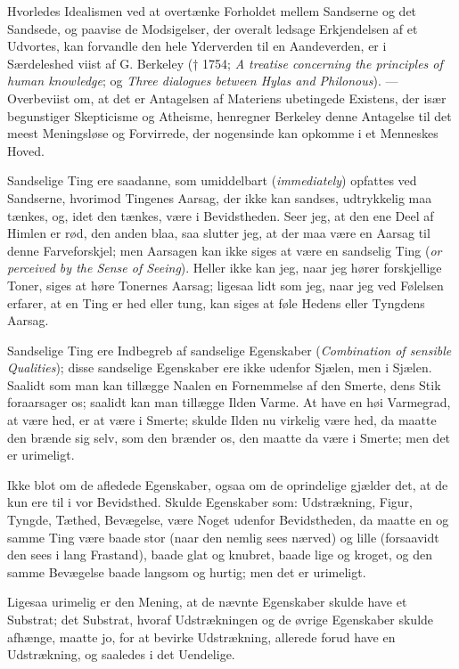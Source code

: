 \documentclass[12pt]{book}
\newcommand{\opage}[1]{\marginnote{\footnotesize\textit{[#1]}}}
\begin{document}
\opage{20} Hvorledes Idealismen ved at overtænke Forholdet mellem Sandserne og det Sandsede,
og paavise de Modsigelser, der overalt ledsage Erkjendelsen af et Udvortes, kan
forvandle den hele Yderverden til en Aandeverden, er i Særdeleshed viist af G.
Berkeley († 1754; \textit{A treatise concerning the principles of human
knowledge}; og \textit{Three dialogues between Hylas and Philonous}). ---
Overbeviist om, at det er Antagelsen af Materiens ubetingede Existens, der især
begunstiger Skepticisme og Atheisme, henregner Berkeley denne Antagelse til det
meest Meningsløse og Forvirrede, der nogensinde kan opkomme i et Menneskes Hoved.

Sandselige Ting ere saadanne, som umiddelbart (\textit{immediately}) opfattes ved
Sandserne, hvorimod Tingenes Aarsag, der ikke kan sandses, udtrykkelig maa tænkes,
og, idet den tænkes, være i Bevidstheden. Seer jeg, at den ene Deel af Himlen er
rød, den anden blaa, saa slutter jeg, at der maa være en Aarsag til denne
Farveforskjel; men Aarsagen kan ikke siges at være en sandselig Ting (\textit{or
perceived by the Sense of Seeing}). Heller ikke kan jeg, naar jeg hører
forskjellige Toner, siges at høre Tonernes Aarsag; ligesaa lidt som jeg, naar jeg
ved Følelsen erfarer, at en Ting er hed eller tung, kan siges at føle Hedens eller
Tyngdens Aarsag.

Sandselige Ting ere Indbegreb af sandselige Egenskaber (\textit{Combination of
sensible Qualities}); disse sandselige Egenskaber ere ikke udenfor Sjælen, men i
Sjælen. Saalidt som man kan tillægge Naalen en Fornemmelse af den Smerte, dens Stik
foraarsager os; saalidt kan man tillægge Ilden Varme. At have en høi Varmegrad, at
være hed, er at være i Smerte; skulde Ilden nu virkelig være hed, da maatte den
brænde sig selv, som den brænder os, den maatte da være i Smerte; men det er
urimeligt.

Ikke blot om de afledede Egenskaber, ogsaa om de oprindelige gjælder det, at de kun
ere til i vor Bevidsthed. Skulde Egenskaber som: Udstrækning, Figur, Tyngde,
Tæthed,
\opage{21} Bevægelse, være Noget udenfor Bevidstheden, da maatte en og samme Ting være baade
stor (naar den nemlig sees nærved) og lille (forsaavidt den sees i lang Frastand),
baade glat og knubret, baade lige og kroget, og den samme Bevægelse baade langsom
og hurtig; men det er urimeligt.

Ligesaa urimelig er den Mening, at de nævnte Egenskaber skulde have et Substrat;
det Substrat, hvoraf Udstrækningen og de øvrige Egenskaber skulde afhænge, maatte
jo, for at bevirke Udstrækning, allerede forud have en Udstrækning, og saaledes i
det Uendelige.
\end{document}
